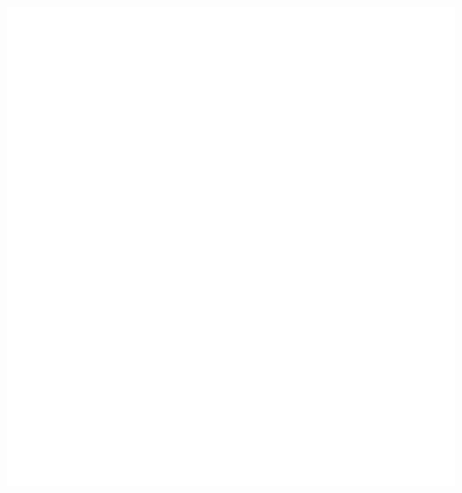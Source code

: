 \documentclass[oneside,openany,headings=optiontotoc,11pt,numbers=noenddot]{scrreprt}
\begin{document}
	\includegraphics[scale=0.15]{empty.jpg}
\end{document}
